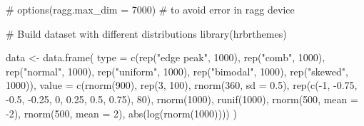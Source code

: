 \documentclass[
  letterpaper,
  DIV=11,
  numbers=noendperiod,
  oneside]{scrartcl}
\newenvironment{Shaded}{\begin{snugshade}}{\end{snugshade}}
\newcommand{\AttributeTok}[1]{\textcolor[rgb]{0.40,0.45,0.13}{#1}}
\newcommand{\CommentTok}[1]{\textcolor[rgb]{0.37,0.37,0.37}{#1}}
\newcommand{\DecValTok}[1]{\textcolor[rgb]{0.68,0.00,0.00}{#1}}
\newcommand{\FloatTok}[1]{\textcolor[rgb]{0.68,0.00,0.00}{#1}}
\newcommand{\FunctionTok}[1]{\textcolor[rgb]{0.28,0.35,0.67}{#1}}
\newcommand{\NormalTok}[1]{\textcolor[rgb]{0.00,0.23,0.31}{#1}}
\newcommand{\OtherTok}[1]{\textcolor[rgb]{0.00,0.23,0.31}{#1}}
\newcommand{\SpecialCharTok}[1]{\textcolor[rgb]{0.37,0.37,0.37}{#1}}
\newcommand{\StringTok}[1]{\textcolor[rgb]{0.13,0.47,0.30}{#1}}
\begin{document}
\begin{Shaded}
\begin{Highlighting}[]
\CommentTok{\# options(ragg.max\_dim = 7000) \# to avoid error in ragg device}

\CommentTok{\# Build dataset with different distributions}
\FunctionTok{library}\NormalTok{(hrbrthemes)}

\NormalTok{data }\OtherTok{\textless{}{-}} \FunctionTok{data.frame}\NormalTok{(}
  \AttributeTok{type =} \FunctionTok{c}\NormalTok{(}\FunctionTok{rep}\NormalTok{(}\StringTok{"edge peak"}\NormalTok{, }\DecValTok{1000}\NormalTok{), }\FunctionTok{rep}\NormalTok{(}\StringTok{"comb"}\NormalTok{, }\DecValTok{1000}\NormalTok{), }\FunctionTok{rep}\NormalTok{(}\StringTok{"normal"}\NormalTok{, }\DecValTok{1000}\NormalTok{), }\FunctionTok{rep}\NormalTok{(}\StringTok{"uniform"}\NormalTok{, }\DecValTok{1000}\NormalTok{), }\FunctionTok{rep}\NormalTok{(}\StringTok{"bimodal"}\NormalTok{, }\DecValTok{1000}\NormalTok{), }\FunctionTok{rep}\NormalTok{(}\StringTok{"skewed"}\NormalTok{, }\DecValTok{1000}\NormalTok{)),}
  \AttributeTok{value =} \FunctionTok{c}\NormalTok{(}\FunctionTok{rnorm}\NormalTok{(}\DecValTok{900}\NormalTok{), }\FunctionTok{rep}\NormalTok{(}\DecValTok{3}\NormalTok{, }\DecValTok{100}\NormalTok{), }\FunctionTok{rnorm}\NormalTok{(}\DecValTok{360}\NormalTok{, }\AttributeTok{sd =} \FloatTok{0.5}\NormalTok{), }\FunctionTok{rep}\NormalTok{(}\FunctionTok{c}\NormalTok{(}\SpecialCharTok{{-}}\DecValTok{1}\NormalTok{, }\SpecialCharTok{{-}}\FloatTok{0.75}\NormalTok{, }\SpecialCharTok{{-}}\FloatTok{0.5}\NormalTok{, }\SpecialCharTok{{-}}\FloatTok{0.25}\NormalTok{, }\DecValTok{0}\NormalTok{, }\FloatTok{0.25}\NormalTok{, }\FloatTok{0.5}\NormalTok{, }\FloatTok{0.75}\NormalTok{), }\DecValTok{80}\NormalTok{), }\FunctionTok{rnorm}\NormalTok{(}\DecValTok{1000}\NormalTok{), }\FunctionTok{runif}\NormalTok{(}\DecValTok{1000}\NormalTok{), }\FunctionTok{rnorm}\NormalTok{(}\DecValTok{500}\NormalTok{, }\AttributeTok{mean =} \SpecialCharTok{{-}}\DecValTok{2}\NormalTok{), }\FunctionTok{rnorm}\NormalTok{(}\DecValTok{500}\NormalTok{, }\AttributeTok{mean =} \DecValTok{2}\NormalTok{), }\FunctionTok{abs}\NormalTok{(}\FunctionTok{log}\NormalTok{(}\FunctionTok{rnorm}\NormalTok{(}\DecValTok{1000}\NormalTok{))))}
\NormalTok{)}


\end{Highlighting}
\end{Shaded}
\end{document}
